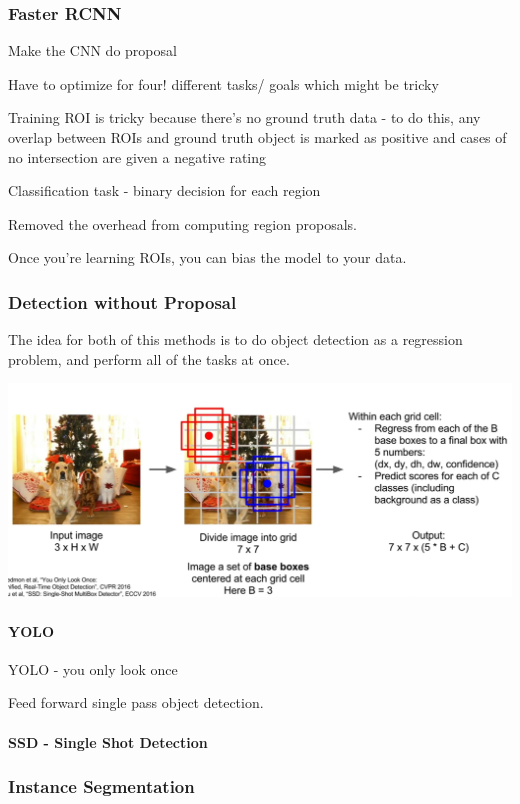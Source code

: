 \subsubsection{Faster RCNN}

Make the CNN do proposal 

Have to optimize for four! different tasks/ goals which might be tricky

Training ROI is tricky because there's no ground truth data - to do this, any overlap between ROIs and ground truth object is marked as positive and cases of no intersection are given a negative rating

Classification task - binary decision for each region

Removed the overhead from computing region proposals.

Once you're learning ROIs, you can bias the model to your data.

\subsubsection{Detection without Proposal}

The idea for both of this methods is to do object detection as a regression problem, and perform all of the tasks at once.

\includegraphics[width=0.5\columnwidth]{fei_fei_li/lecture_11/YOLO_SSD.png}

\paragraph{YOLO}

YOLO - you only look once

Feed forward single pass object detection.


\paragraph{SSD - Single Shot Detection}

\subsubsection{Instance Segmentation}

